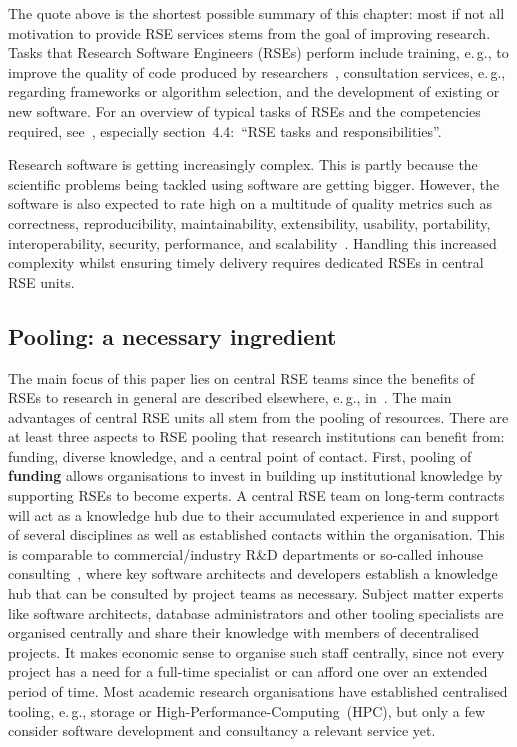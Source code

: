 \documentclass[10pt,letterpaper]{article}
\newcommand*{\eg}{e.\,g.,\xspace}
\begin{document}
The quote above is the shortest possible summary of this chapter: most if not all motivation to provide RSE services stems from the goal of improving research.
Tasks that Research Software Engineers (RSEs) perform include training, \eg{} to improve the quality of code produced by researchers~\autocite{Ostlund2023}, consultation services, \eg{} regarding frameworks or algorithm selection, and the development of existing or new software.
For an overview of typical tasks of RSEs and the competencies required, see~\autocite{goth_foundational_competencies_2024}, especially section\ 4.4:\ “RSE tasks and responsibilities”.

Research software is getting increasingly complex.
This is partly because the scientific problems being tackled using software are getting bigger.
However, the software is also expected to rate high on a multitude of quality metrics such as correctness, reproducibility, maintainability, extensibility, usability, portability, interoperability, security, performance, and scalability~\autocite[Chapter 16]{Schulmeyer2008}.
Handling this increased complexity whilst ensuring timely delivery requires dedicated RSEs in central RSE units.

\subsection*{Pooling: a necessary ingredient}
The main focus of this paper lies on central RSE teams since the benefits of RSEs to research in general are described elsewhere, \eg{} in~\autocite{Anzt2021}.
The main advantages of central RSE units all stem from the pooling of resources.
There are at least three aspects to RSE pooling that research institutions can benefit from: funding, diverse knowledge, and a central point of contact.
First, pooling of \textbf{funding} allows organisations to invest in building up institutional knowledge by supporting RSEs to become experts.
A central RSE team on long-term contracts will act as a knowledge hub due to their accumulated experience in and support of several disciplines as well as established contacts within the organisation.
This is comparable to commercial/industry R\&D departments or so-called inhouse consulting~\autocite{Grima_2011}, where key software architects and developers establish a knowledge hub that can be consulted by project teams as necessary.
Subject matter experts like software architects, database administrators and other tooling specialists are organised centrally and share their knowledge with members of decentralised projects.
It makes economic sense to organise such staff centrally, since not every project has a need for a full-time specialist or can afford one over an extended period of time.
Most academic research organisations have established centralised tooling, \eg{} storage or High-Performance-Computing\ (HPC), but only a few consider software development and consultancy a relevant service yet.
\end{document}
